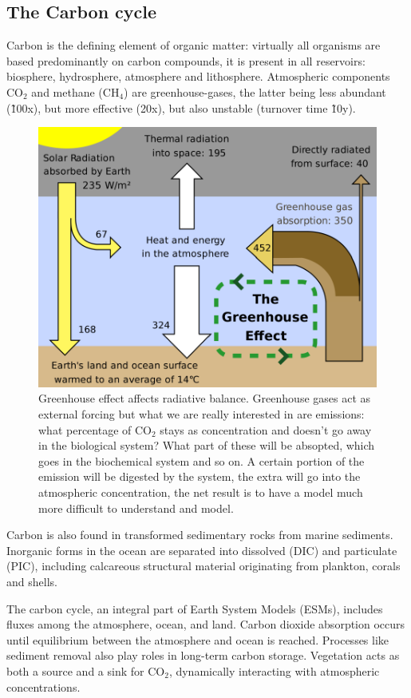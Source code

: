 \subsection{The Carbon cycle}
Carbon is the defining element of organic matter: virtually all organisms are based predominantly on carbon compounds, it is present in all reservoirs: biosphere, hydrosphere, atmosphere and lithosphere. Atmospheric components CO$_2$ and methane (CH$_4$) are greenhouse-gases, the latter being less abundant (\~100x), but more effective (20x), but also unstable (turnover time \~10y). 
\begin{figure}[htpb]
    \centering
    \includegraphics[width=0.4\linewidth]{uploads/greenhouse situa.png}
    \caption{Greenhouse effect affects radiative balance. Greenhouse gases act as external forcing but what we are really interested in are emissions: what percentage of CO$_2$ stays as concentration and doesn't go away in the biological system? What part of these will be absopted, which goes in the biochemical system and so on. 
A certain portion of the emission will be digested by the system, the extra will go into the atmospheric concentration, the net result is to have a model much more difficult to understand and model.}
    
\end{figure}
Carbon is also found in transformed sedimentary rocks from marine sediments. Inorganic forms in the ocean are separated into dissolved (DIC) and particulate (PIC), including calcareous structural material originating from plankton, corals and shells. 

The carbon cycle, an integral part of Earth System Models (ESMs), includes fluxes among the atmosphere, ocean, and land. Carbon dioxide absorption occurs until equilibrium between the atmosphere and ocean is reached. Processes like sediment removal also play roles in long-term carbon storage. Vegetation acts as both a source and a sink for CO$_2$, dynamically interacting with atmospheric concentrations.\\



